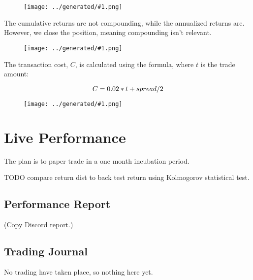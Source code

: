 \documentclass[a4paper]{article}
\newcommand{\figureTau}[1]{
    \begin{figure}[H]
        \begin{center}
            \texttt{[image: ../generated/\#1.png]}
        \end{center}
    \end{figure}
}
\begin{document}
\figureTau{returns}

The cumulative returns are not compounding, while the annualized returns are.
However, we close the position, meaning compounding isn't relevant.

\figureTau{cumulative_returns}

The transaction cost, $C$, is calculated using the formula, where $t$ is the trade amount:

\begin{equation}
\label{eq:NPV_L}
C = 0.02 * t + spread/2
\end{equation}

\figureTau{cumulative_returns_except_trans_costs}

\section{Live Performance}

The plan is to paper trade in a one month incubation period.

TODO compare return dist to back test return using Kolmogorov statistical test. %

\subsection{Performance Report}

(Copy Discord report.)

\subsection{Trading Journal}

No trading have taken place, so nothing here yet.

\end{document}
